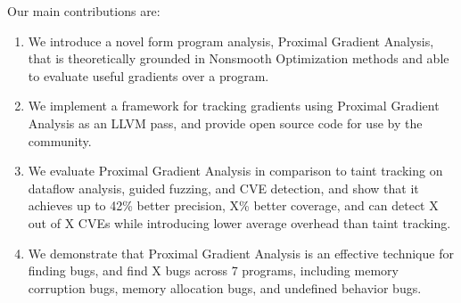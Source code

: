 Our main contributions are:

\vspace{-1pt}
\begin{enumerate}
\item We introduce a novel form program analysis, Proximal Gradient Analysis, that is theoretically grounded in Nonsmooth Optimization methods and able to evaluate useful gradients over a program.
\item We implement a framework for tracking gradients using Proximal Gradient Analysis as an LLVM pass, and provide open source code for use by the community.
\item We evaluate Proximal Gradient Analysis in comparison to taint tracking on dataflow analysis, guided fuzzing, and CVE detection, and show that it achieves up to 42\% better precision, X\% better coverage, and can detect X out of X CVEs while introducing lower average overhead than taint tracking.
\item We demonstrate that Proximal Gradient Analysis is an effective technique for finding bugs, and find X bugs across 7 programs, including memory corruption bugs, memory allocation bugs, and undefined behavior bugs.
\end{enumerate}
\vspace{-5pt}












